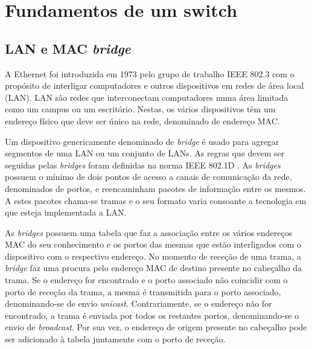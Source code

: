 


\chapter{Fundamentos de um switch}
\label{chapter:implementation}
\section{LAN e MAC \textit{bridge}}
A Ethernet foi introduzida em 1973 pelo grupo de trabalho IEEE 802.3 com o propósito de interligar computadores e outros dispositivos em redes de área local (LAN). LAN são redes que interconectam computadores numa área limitada como um campus ou um escritório. Nestas, os vários dispositivos têm um endereço físico que deve ser único na rede, denominado de endereço MAC. \par 
Um dispositivo genericamente denominado de \textit{bridge} é usado para agregar segmentos de uma LAN ou um conjunto de LANs. As regras que devem ser seguidas pelas \textit{bridges} foram definidas na norma IEEE 802.1D  \cite{Bridge}. As \textit{bridges} possuem o mínimo de dois pontos de acesso a canais de comunicação da rede, denominados de portos, e reencaminham pacotes de informação entre os mesmos. A estes pacotes chama-se tramas e o seu formato varia consoante a tecnologia em que esteja implementada a LAN. \par 
As \textit{bridges} possuem uma tabela que faz a associação entre os vários endereços MAC do seu conhecimento e os portos das mesmas que estão interligados com o dispositivo com o respectivo endereço. No momento de receção de uma trama, a \textit{bridge} faz uma procura pelo endereço MAC de destino presente no cabeçalho da trama. Se o endereço for encontrado e o porto associado não coincidir com o porto de receção da trama, a mesma é transmitida para o porto associado, denominando-se de envio \textit{unicast}. Contrariamente, se o endereço não for encontrado, a trama é enviada por todos os restantes portos, denominando-se o envio de \textit{broadcast}. Por sua vez, o endereço de origem presente no cabeçalho pode ser adicionado à tabela juntamente com o porto de receção.

